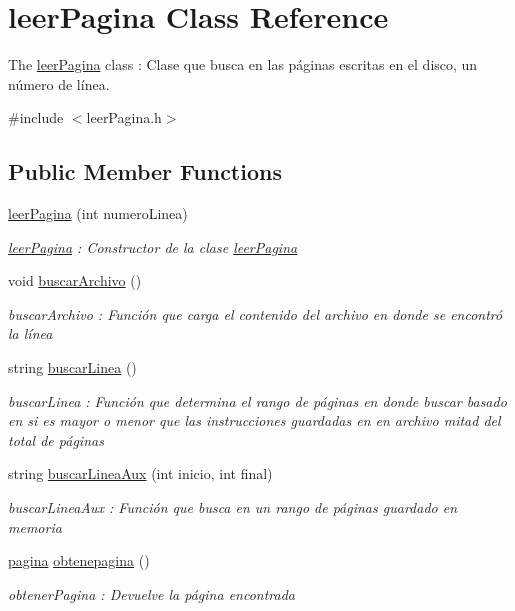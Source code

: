 \hypertarget{classleer_pagina}{}\section{leer\+Pagina Class Reference}
\label{classleer_pagina}


The \hyperlink{classleer_pagina}{leer\+Pagina} class \+: Clase que busca en las páginas escritas en el disco, un número de línea.  




{\ttfamily \#include $<$leer\+Pagina.\+h$>$}

\subsection*{Public Member Functions}
\begin{DoxyCompactItemize}
\item 
\hyperlink{classleer_pagina_ab1009387aa6c3d1ad7429768faafa811}{leer\+Pagina} (int numero\+Linea)
\begin{DoxyCompactList}\small\item\em \hyperlink{classleer_pagina}{leer\+Pagina} \+: Constructor de la clase \hyperlink{classleer_pagina}{leer\+Pagina} \end{DoxyCompactList}\item 
void \hyperlink{classleer_pagina_ac1d0350d60b20a70500a6ffb1078783a}{buscar\+Archivo} ()\hypertarget{classleer_pagina_ac1d0350d60b20a70500a6ffb1078783a}{}\label{classleer_pagina_ac1d0350d60b20a70500a6ffb1078783a}

\begin{DoxyCompactList}\small\item\em buscar\+Archivo \+: Función que carga el contenido del archivo en donde se encontró la línea \end{DoxyCompactList}\item 
string \hyperlink{classleer_pagina_a9d91208a6e7eb986394b6491384efa92}{buscar\+Linea} ()
\begin{DoxyCompactList}\small\item\em buscar\+Linea \+: Función que determina el rango de páginas en donde buscar basado en si es mayor o menor que las instrucciones guardadas en en archivo mitad del total de páginas \end{DoxyCompactList}\item 
string \hyperlink{classleer_pagina_abbeafc685dfd2dcfc36c656ad5c27690}{buscar\+Linea\+Aux} (int inicio, int final)
\begin{DoxyCompactList}\small\item\em buscar\+Linea\+Aux \+: Función que busca en un rango de páginas guardado en memoria \end{DoxyCompactList}\item 
\hyperlink{classpagina}{pagina} \hyperlink{classleer_pagina_af93635115105afe524e89bfb75d8174d}{obtenepagina} ()
\begin{DoxyCompactList}\small\item\em obtener\+Pagina \+: Devuelve la página encontrada \end{DoxyCompactList}\end{DoxyCompactItemize}


